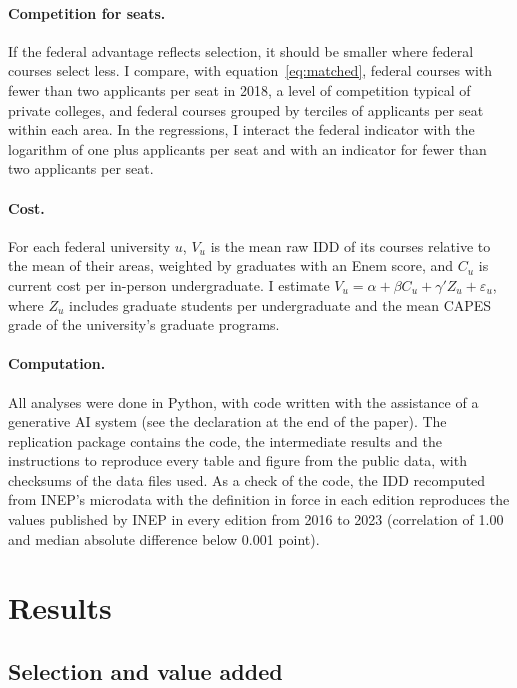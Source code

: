 \documentclass[11pt,a4paper]{article}
\begin{document}
\paragraph{Competition for seats.} If the federal advantage reflects selection, it should be smaller where federal courses select less. I compare, with equation~\eqref{eq:matched}, federal courses with fewer than two applicants per seat in 2018, a level of competition typical of private colleges, and federal courses grouped by terciles of applicants per seat within each area. In the regressions, I interact the federal indicator with the logarithm of one plus applicants per seat and with an indicator for fewer than two applicants per seat.

\paragraph{Cost.} For each federal university $u$, $V_u$ is the mean raw IDD of its courses relative to the mean of their areas, weighted by graduates with an Enem score, and $C_u$ is current cost per in-person undergraduate. I estimate $V_u=\alpha+\beta C_u+\gamma'Z_u+\varepsilon_u$, where $Z_u$ includes graduate students per undergraduate and the mean CAPES grade of the university's graduate programs.

\paragraph{Computation.} All analyses were done in Python, with code written with the assistance of a generative AI system (see the declaration at the end of the paper). The replication package contains the code, the intermediate results and the instructions to reproduce every table and figure from the public data, with checksums of the data files used. As a check of the code, the IDD recomputed from INEP's microdata with the definition in force in each edition reproduces the values published by INEP in every edition from 2016 to 2023 (correlation of 1.00 and median absolute difference below 0.001 point).

\section{Results}\label{sec:results}

\subsection{Selection and value added}
\end{document}
